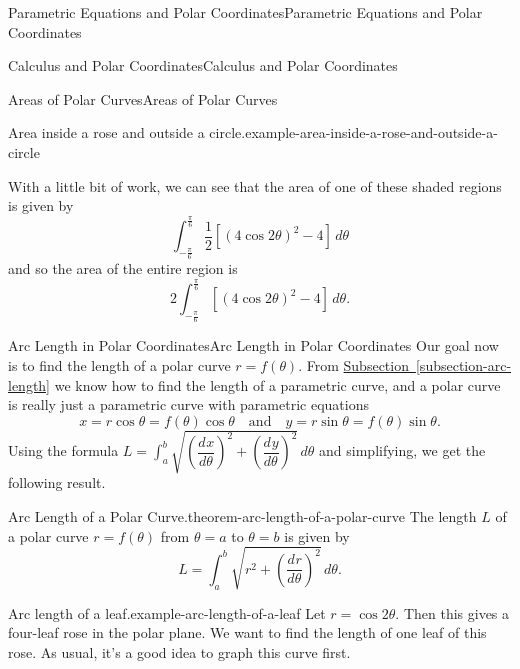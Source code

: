 \documentclass[10pt,]{book}
\numberwithin{equation}{section}
\newcommand{\dv}[3][]{\dfrac{d^{#1} #2}{d #3^{#1}}}
\begin{document}
\begin{chapterptx}{Parametric Equations and Polar Coordinates}{}{Parametric Equations and Polar Coordinates}{}{}
\begin{sectionptx}{Calculus and Polar Coordinates}{}{Calculus and Polar Coordinates}{}{}
\begin{subsectionptx}{Areas of Polar Curves}{}{Areas of Polar Curves}{}{}
\begin{example}{Area inside a rose and outside a circle.}{example-area-inside-a-rose-and-outside-a-circle}
\begin{figure}
{\begin{tikzpicture}[scale=.5]
\end{tikzpicture}
}
\end{figure}
\hypertarget{p-836}{}%
With a little bit of work, we can see that the area of one of these shaded regions is given by%
%
\begin{equation*}
\int_{-\frac{\pi}{6}}^{\frac{\pi}{6}} \frac{1}{2}[(4\cos2\theta)^{2}-4]\,d\theta
\end{equation*}
\hypertarget{p-837}{}%
and so the area of the entire region is%
%
\begin{equation*}
2\int_{-\frac{\pi}{6}}^{\frac{\pi}{6}}[(4\cos2\theta)^{2}-4]\,d\theta.
\end{equation*}
\end{example}
\end{subsectionptx}
%
%
\typeout{************************************************}
\typeout{************************************************}
%
\begin{subsectionptx}{Arc Length in Polar Coordinates}{}{Arc Length in Polar Coordinates}{}{}\label{subsection-arc-length-in-polar-coordinates}
\hypertarget{p-838}{}%
Our goal now is to find the length of a polar curve \(r=f(\theta)\). From \hyperref[subsection-arc-length]{Subsection~\ref{subsection-arc-length}} we know how to find the length of a parametric curve, and a polar curve is really just a parametric curve with parametric equations%
%
\begin{equation*}
x = r\cos\theta = f(\theta)\cos\theta \quad\text{and}\quad y = r\sin\theta = f(\theta)\sin\theta.
\end{equation*}
\hypertarget{p-839}{}%
Using the formula \(L = \int_{a}^{b}\sqrt{(\dv{x}{\theta})^{2}+(\dv{y}{\theta})^{2}}\,d\theta\) and simplifying, we get the following result.%
\begin{theorem}{Arc Length of a Polar Curve.}{}{theorem-arc-length-of-a-polar-curve}%
\hypertarget{p-840}{}%
The length \(L\) of a polar curve \(r = f(\theta)\) from \(\theta=a\) to \(\theta=b\) is given by%
\begin{equation*}
L = \int_{a}^{b}\sqrt{r^{2} + \left(\dv{r}{\theta}\right)^{2}}\,d\theta.
\end{equation*}
%
\end{theorem}
\begin{example}{Arc length of a leaf.}{example-arc-length-of-a-leaf}%
\hypertarget{p-841}{}%
Let \(r = \cos2\theta\). Then this gives a four-leaf rose in the polar plane. We want to find the length of one leaf of this rose. As usual, it's a good idea to graph this curve first.%

\end{example}
\end{subsectionptx}
\end{sectionptx}
\end{chapterptx}
\end{document}
